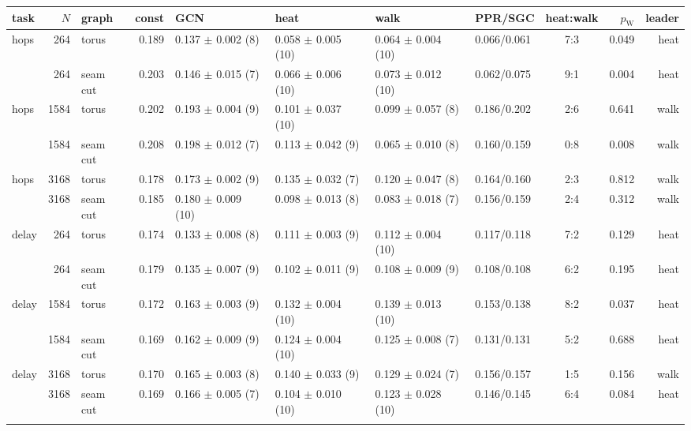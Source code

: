 {\scriptsize\setlength{\tabcolsep}{2.5pt}
\begin{tabular}{@{}lrlrllllcrr@{}}
\toprule
task & $N$ & graph & const & GCN & heat & walk & PPR/SGC & heat:walk & $p_{\mathrm{W}}$ & leader \\
\midrule
hops & 264 & torus & 0.189 & 0.137 $\pm$ 0.002 (8) & 0.058 $\pm$ 0.005 (10) & 0.064 $\pm$ 0.004 (10) & 0.066/0.061 & 7:3 & 0.049 & heat \\
 & 264 & seam cut & 0.203 & 0.146 $\pm$ 0.015 (7) & 0.066 $\pm$ 0.006 (10) & 0.073 $\pm$ 0.012 (10) & 0.062/0.075 & 9:1 & 0.004 & heat \\
\addlinespace[2pt]
hops & 1584 & torus & 0.202 & 0.193 $\pm$ 0.004 (9) & 0.101 $\pm$ 0.037 (10) & 0.099 $\pm$ 0.057 (8) & 0.186/0.202 & 2:6 & 0.641 & walk \\
 & 1584 & seam cut & 0.208 & 0.198 $\pm$ 0.012 (7) & 0.113 $\pm$ 0.042 (9) & 0.065 $\pm$ 0.010 (8) & 0.160/0.159 & 0:8 & 0.008 & walk \\
\addlinespace[2pt]
hops & 3168 & torus & 0.178 & 0.173 $\pm$ 0.002 (9) & 0.135 $\pm$ 0.032 (7) & 0.120 $\pm$ 0.047 (8) & 0.164/0.160 & 2:3 & 0.812 & walk \\
 & 3168 & seam cut & 0.185 & 0.180 $\pm$ 0.009 (10) & 0.098 $\pm$ 0.013 (8) & 0.083 $\pm$ 0.018 (7) & 0.156/0.159 & 2:4 & 0.312 & walk \\
\addlinespace[2pt]
delay & 264 & torus & 0.174 & 0.133 $\pm$ 0.008 (8) & 0.111 $\pm$ 0.003 (9) & 0.112 $\pm$ 0.004 (10) & 0.117/0.118 & 7:2 & 0.129 & heat \\
 & 264 & seam cut & 0.179 & 0.135 $\pm$ 0.007 (9) & 0.102 $\pm$ 0.011 (9) & 0.108 $\pm$ 0.009 (9) & 0.108/0.108 & 6:2 & 0.195 & heat \\
\addlinespace[2pt]
delay & 1584 & torus & 0.172 & 0.163 $\pm$ 0.003 (9) & 0.132 $\pm$ 0.004 (10) & 0.139 $\pm$ 0.013 (10) & 0.153/0.138 & 8:2 & 0.037 & heat \\
 & 1584 & seam cut & 0.169 & 0.162 $\pm$ 0.009 (9) & 0.124 $\pm$ 0.004 (10) & 0.125 $\pm$ 0.008 (7) & 0.131/0.131 & 5:2 & 0.688 & heat \\
\addlinespace[2pt]
delay & 3168 & torus & 0.170 & 0.165 $\pm$ 0.003 (8) & 0.140 $\pm$ 0.033 (9) & 0.129 $\pm$ 0.024 (7) & 0.156/0.157 & 1:5 & 0.156 & walk \\
 & 3168 & seam cut & 0.169 & 0.166 $\pm$ 0.005 (7) & 0.104 $\pm$ 0.010 (10) & 0.123 $\pm$ 0.028 (10) & 0.146/0.145 & 6:4 & 0.084 & heat \\
\addlinespace[2pt]
\bottomrule
\end{tabular}
}
